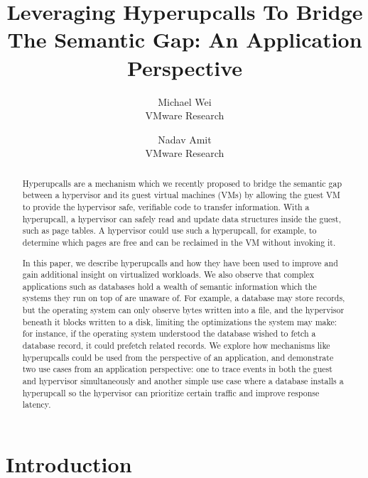 \documentclass[11pt]{article}
\begin{document}
\title{Leveraging Hyperupcalls To Bridge The Semantic Gap: An Application Perspective}

\date{}

\author{
{\rm Michael Wei}\\
VMware Research
\and
{\rm Nadav Amit}\\
VMware Research
} 

\maketitle

\begin{abstract}

Hyperupcalls are a mechanism which we recently proposed
to bridge the semantic gap between a hypervisor
and its guest virtual machines (VMs) by allowing the guest VM
to provide the hypervisor safe, verifiable code to transfer information.
With a hyperupcall, a hypervisor can safely read and update data
structures inside the guest, such as page tables. A hypervisor could
use such a hyperupcall, for example, to determine which pages are
free and can be reclaimed in the VM without invoking it.

In this paper, we describe hyperupcalls and how they have been used
to improve and gain additional insight on virtualized workloads. We
also observe that complex applications such as databases hold a
wealth of semantic information which the systems they run on top of
are unaware of. For example, a database may store records, but the
operating system can only observe bytes written into a file, and the
hypervisor beneath it blocks written to a disk, limiting the optimizations the
system may make: for instance, if the operating system understood the database
wished to fetch a database record, it could prefetch related records.
We explore how mechanisms like hyperupcalls could be used from
the perspective of an application, and demonstrate two use cases from an application
perspective: one to trace events in both the guest and hypervisor simultaneously and 
another simple use case 
where a database installs a hyperupcall so the hypervisor can prioritize
certain traffic and improve response latency.

\end{abstract}

\section{Introduction}
\label{sec:introduction}
\end{document}
